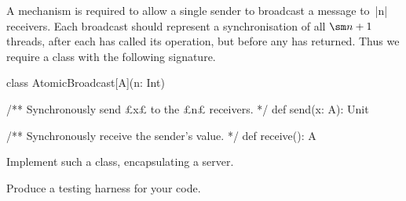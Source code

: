 \begin{questionS}
A mechanism is required to allow a single sender to broadcast a message to~|n|
receivers.  Each broadcast should represent a synchronisation of all $\sm n +
1$ threads, after each has called its operation, but before any has returned. 
Thus we require a class with the following signature.
%
\begin{scala}
class AtomicBroadcast[A](n: Int){
  /** Synchronously send £x£ to the £n£ receivers. */
  def send(x: A): Unit

  /** Synchronously receive the sender's value. */
  def receive(): A 
}
\end{scala}
%
Implement such a class, encapsulating a server.

Produce a testing harness for your code.
\end{questionS}


